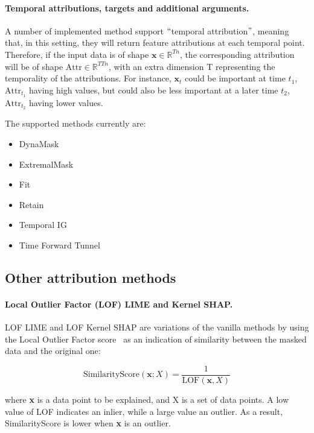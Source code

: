 \paragraph{Temporal attributions, targets and additional arguments.}

A number of implemented method support $``$temporal attribution$"$, meaning that, in this setting, they will return
feature attributions at each temporal point.
Therefore, if the input data is of shape $\textbf{x} \in \mathbb{R}^{Tn}$, the corresponding attribution will be of
shape $\textrm{Attr} \in \mathbb{R}^{TTn}$, with an extra dimension T representing the temporality of the attributions.
For instance, $\textbf{x}_t$ could be important at time $t_1$, $\textrm{Attr}_{t_1}$ having high values, but could also
be less important at a later time $t_2$, $\textrm{Attr}_{t_2}$ having lower values.

The supported methods currently are:

\begin{itemize}
    \item DynaMask
    \item ExtremalMask
    \item Fit
    \item Retain
    \item Temporal IG
    \item Time Forward Tunnel
\end{itemize}


\subsection{Other attribution methods}
\label{subsec:other-attribution-methods}

\paragraph{Local Outlier Factor (LOF) LIME and Kernel SHAP\@.}

LOF LIME and LOF Kernel SHAP are variations of the vanilla methods by using the Local Outlier Factor
score~\citep{breunig2000lof} as an indication of similarity between the masked data and the original one:

\[ \textrm{SimilarityScore}(\textbf{x}; X) = \frac{1}{\textrm{LOF}(\textbf{x}, X)} \]

where \textbf{x} is a data point to be explained, and X is a set of data points.
A low value of LOF indicates an inlier, while a large value an outlier.
As a result, SimilarityScore is lower when \textbf{x} is an outlier.

